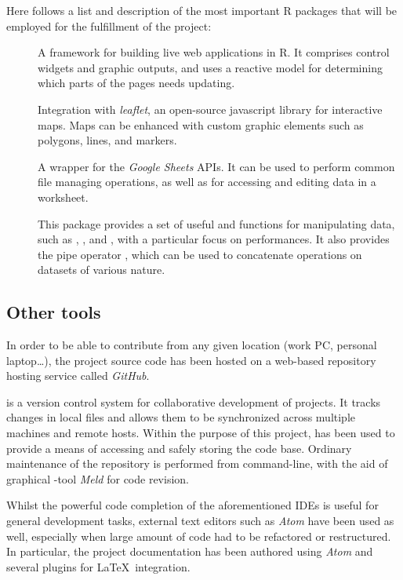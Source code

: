 Here follows a list and description of the most important R packages that will be employed for the fulfillment of the project:

\begin{description}
	\item[] A framework for building live web applications in R. It comprises control widgets and graphic outputs, and uses a reactive model for determining which parts of the pages needs updating.
	\item[] Integration with \emph{leaflet}, an open-source javascript library for interactive maps. Maps can be enhanced with custom graphic elements such as polygons, lines, and markers.
	\item[] A wrapper for the \emph{Google Sheets} APIs. It can be used to perform common file managing operations, as well as for accessing and editing data in a worksheet.
	\item[] This package provides a set of useful and functions for manipulating data, such as , , and , with a particular focus on performances. It also provides the pipe operator \code{\%>\%}, which can be used to concatenate operations on datasets of various nature.
\end{description}


\subsection{Other tools}
In order to be able to contribute from any given location (work PC, personal laptop\dots), the project source code has been hosted on a web-based  repository hosting service called \emph{GitHub}.

 is a version control system for collaborative development of projects.
It tracks changes in local files and allows them to be synchronized across multiple machines and remote hosts.
Within the purpose of this project,  has been used to provide a means of accessing and safely storing the code base.
Ordinary maintenance of the repository is performed from command-line, with the aid of graphical -tool \emph{Meld} for code revision.

Whilst the powerful code completion of the aforementioned IDEs is useful for general development tasks, external text editors such as \emph{Atom} have been used as well, especially when large amount of code had to be refactored or restructured.
In particular, the project documentation has been authored using \emph{Atom} and several plugins for \LaTeX\ integration.
